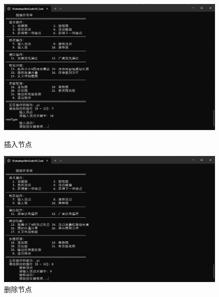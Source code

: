 \documentclass[supercite]{Experimental_Report}
\theoremstyle{definition}
\begin{document}
\begin{figure}[htb]
	\begin{center}
		\includegraphics[scale=0.30]{images/2-6.jpg}
		\caption{插入节点}
		\label{fig2-6}
	\end{center}

	\begin{center}
		\includegraphics[scale=0.30]{images/2-7.jpg}
		\caption{删除节点}
		\label{fig2-7}
	\end{center}
\end{figure}
\end{document}
